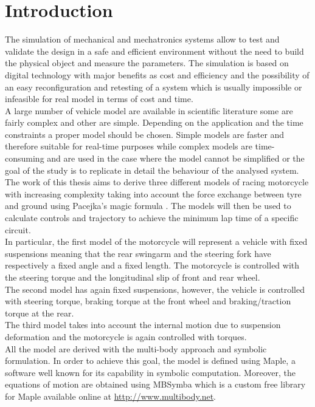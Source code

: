 \chapter*{Introduction}
%
The simulation of mechanical and mechatronics systems allow to test and validate the design in a safe and efficient environment without the need to build the physical object and measure the parameters. The simulation is based on digital technology with major benefits as cost and efficiency and the possibility of an easy reconfiguration and retesting of a system which is usually impossible or infeasible for real model in terms of cost and time.\cite{maria1997introduction}\\
A large number of vehicle model are available in scientific literature some are fairly complex and other are simple. Depending on the application and the time constraints a proper model should be chosen. Simple models are faster and therefore suitable for real-time purposes while complex models are time-consuming and are used in the case where the model cannot be simplified or the goal of the study is to replicate in detail the behaviour of the analysed system.\\
The work of this thesis aims to derive three different models of racing motorcycle with increasing complexity taking into account the force exchange between tyre and ground using Pacejka's magic formula \cite{pacejka2006tyre}. The models will then be used to calculate controls and trajectory to achieve the minimum lap time of a specific circuit.\\
In particular, the first model of the motorcycle will represent a vehicle with fixed suspensions meaning that the rear swingarm and the steering fork have respectively a fixed angle and a fixed length. The motorcycle is controlled with the steering torque and the longitudinal slip of front and rear wheel.\\
The second model has again fixed suspensions, however, the vehicle is controlled with steering torque, braking torque at the front wheel and braking/traction torque at the rear.\\  
The third model takes into account the internal motion due to suspension deformation and the motorcycle is again controlled with torques.\\
All the model are derived with the multi-body approach and symbolic formulation. In order to achieve this goal, the model is defined using Maple, a software well known for its capability in symbolic computation. Moreover, the equations of motion are obtained using MBSymba which is a custom free library for Maple available online at \url{http://www.multibody.net}.\\
